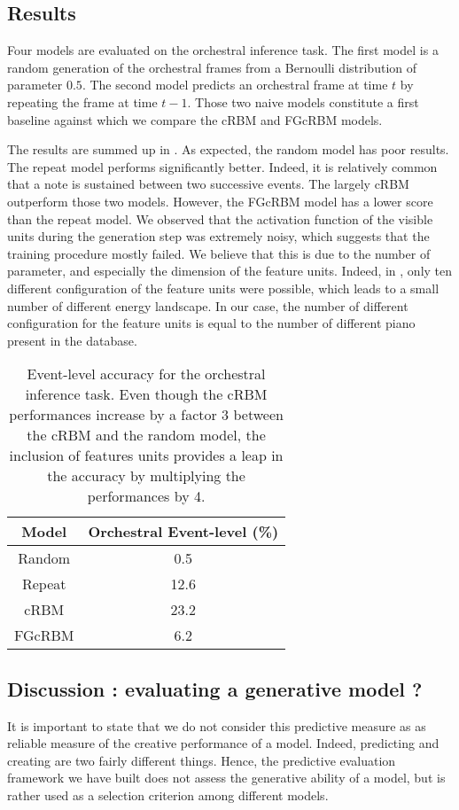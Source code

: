 \documentclass[letterpaper]{article}
\begin{document}
\subsection{Results}
Four models are evaluated on the orchestral inference task. The first model is a random generation of the orchestral frames from a Bernoulli distribution of parameter $0.5$. The second model predicts an orchestral frame at time $t$ by repeating the frame at time $t-1$. Those two naive models constitute a first baseline against which we compare the cRBM and FGcRBM models.

The results are summed up in . As expected, the random model has poor results. The repeat model performs significantly better. Indeed, it is relatively common that a note is sustained between two successive events. The largely cRBM outperform those two models. However, the FGcRBM model has a lower score than the repeat model. We observed that the activation function of the visible units during the generation step was extremely noisy, which suggests that the training procedure mostly failed. We believe that this is due to the number of parameter,  and especially the dimension of the feature units. Indeed, in \cite{taylor2009factored}, only ten different configuration of the feature units were possible, which leads to a small number of different energy landscape. In our case, the number of different configuration for the feature units is equal to the number of different piano present in the database.

\begin{table}[h]
\centering
\begin{tabular}{c c}
\hline
Model & Orchestral Event-level (\%)\\
\hline
Random & 0.5\\ 
Repeat & 12.6\\
\hline \hline
cRBM & 23.2\\ 
FGcRBM & 6.2\\ 
\end{tabular}
\caption{Event-level accuracy for the orchestral inference task. Even though the cRBM performances increase by a factor 3 between the cRBM and the random model, the inclusion of features units provides a leap in the accuracy by multiplying the performances by 4.}
\label{tab:result_event_level}
\end{table}

\subsection{Discussion : evaluating a generative model ?}
It is important to state that we do not consider this predictive measure as as reliable measure of the creative performance of a model. Indeed, predicting and creating are two fairly different things. 
Hence, the predictive evaluation framework we have built does not assess the generative ability of a model, but is rather used as a selection criterion among different models.
\end{document}
